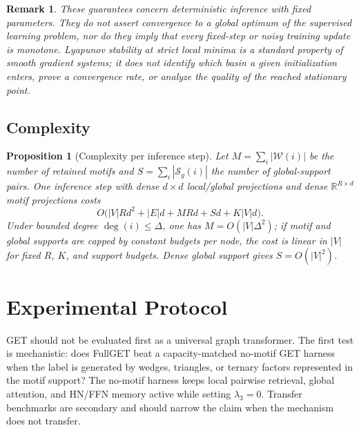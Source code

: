 \documentclass[11pt,a4paper]{article}
\newtheorem{proposition}{Proposition}
\newtheorem{remark}{Remark}
\begin{document}
\begin{remark}
These guarantees concern deterministic inference with fixed parameters. They
do not assert convergence to a global optimum of the supervised learning
problem, nor do they imply that every fixed-step or noisy training update is
monotone. Lyapunov stability at strict local minima is a standard property of
smooth gradient systems; it does not identify which basin a given initialization
enters, prove a convergence rate, or analyze the quality of the reached
stationary point.
\end{remark}

\subsection{Complexity}

\begin{proposition}[Complexity per inference step]
\label{prop:complexity}
Let $M=\sum_i |\mathcal{W}(i)|$ be the number of retained motifs and
$S=\sum_i|\mathcal S_g(i)|$ the number of global-support pairs. One inference
step with dense $d\times d$ local/global projections and dense
$\mathbb{R}^{R\times d}$ motif projections costs
\begin{equation}
  O\bigl(|V|Rd^2 + |E|d + MRd + Sd + K|V|d\bigr).
\end{equation}
Under bounded degree $\deg(i)\le\Delta$, one has $M=O(|V|\Delta^2)$; if motif
and global supports are capped by constant budgets per node, the cost is linear
in $|V|$ for fixed $R$, $K$, and support budgets. Dense global support gives
$S=O(|V|^2)$.
\end{proposition}

\section{Experimental Protocol}

GET should not be evaluated first as a universal graph transformer. The first
test is mechanistic: does FullGET beat a capacity-matched no-motif GET harness
when the label is generated by wedges, triangles, or ternary factors represented
in the motif support? The no-motif harness keeps local pairwise retrieval,
global attention, and HN/FFN memory active while setting $\lambda_3=0$.
Transfer benchmarks are secondary and should narrow the claim when the
mechanism does not transfer.
\end{document}
